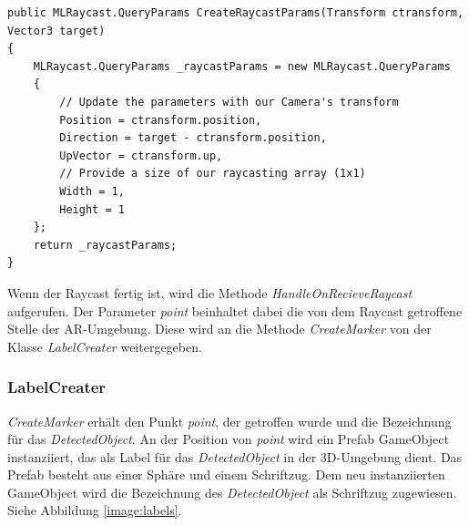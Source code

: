 

\begin{lstlisting}
public MLRaycast.QueryParams CreateRaycastParams(Transform ctransform, Vector3 target)
{
	MLRaycast.QueryParams _raycastParams = new MLRaycast.QueryParams
	{
		// Update the parameters with our Camera's transform
		Position = ctransform.position,
		Direction = target - ctransform.position,
		UpVector = ctransform.up,
		// Provide a size of our raycasting array (1x1)
		Width = 1,
		Height = 1
	};
	return _raycastParams;
}
\end{lstlisting}
Wenn der Raycast fertig ist, wird die Methode \textit{HandleOnRecieveRaycast} aufgerufen. Der Parameter \textit{point} beinhaltet dabei die von dem Raycast getroffene Stelle der AR-Umgebung. Diese wird an die Methode \textit{CreateMarker} von der Klasse \textit{LabelCreater} weitergegeben.

\subsubsection{LabelCreater}


\textit{CreateMarker} erhält den Punkt \textit{point}, der getroffen wurde und die Bezeichnung für das \textit{DetectedObject}. An der Position von \textit{point} wird ein Prefab GameObject instanziiert, das als Label für das \textit{DetectedObject} in der 3D-Umgebung dient. Das Prefab besteht aus einer Sphäre und einem Schriftzug. Dem neu instanziierten GameObject wird die Bezeichnung des \textit{DetectedObject} als Schriftzug zugewiesen. Siehe Abbildung \ref{image:labels}.

